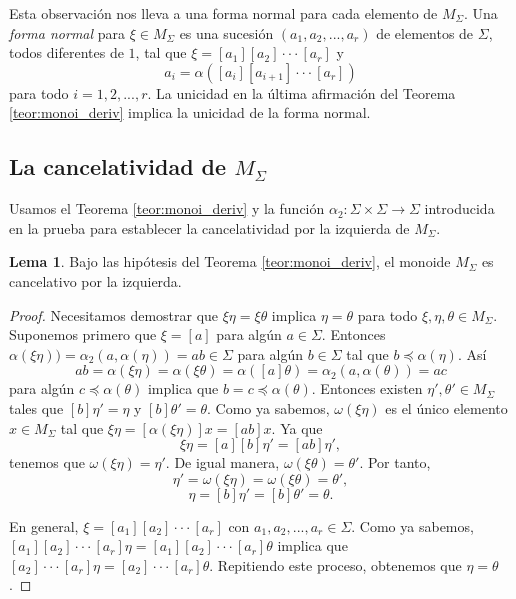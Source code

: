 \documentclass[12pt]{book}
\theoremstyle{definition}
\newtheorem{lema}{Lema}[section]
\begin{document}
Esta observación nos lleva a una forma normal para cada elemento de $M_\Sigma$. Una \textit{forma normal} para $\xi\in M_\Sigma$ es una sucesión $(a_1,a_2,...,a_r)$ de elementos de $\Sigma$, todos diferentes de $1$, tal que $\xi=[a_1][a_2]\cdot\cdot\cdot[a_r]$ y 
$$a_i=\alpha([a_i][a_{i+1}]\cdot\cdot\cdot[a_r])$$
para todo $i=1,2,...,r$. La unicidad en la última afirmación del Teorema \ref{teor:monoi_deriv} implica la unicidad de la forma normal.


\subsection{La cancelatividad de $M_\Sigma$}

Usamos el Teorema \ref{teor:monoi_deriv} y la función $\alpha_2:\Sigma\times\Sigma\rightarrow\Sigma$ introducida en la prueba para establecer la cancelatividad por la izquierda de $M_\Sigma$.

\begin{lema}
Bajo las hipótesis del Teorema \ref{teor:monoi_deriv}, el monoide $M_\Sigma$ es cancelativo por la izquierda.
\label{lema:cancel}
\end{lema}

\begin{proof} Necesitamos demostrar que $\xi\eta=\xi\theta$ implica $\eta=\theta$ para todo $\xi,\eta,\theta\in M_\Sigma$. Suponemos primero que $\xi=[a]$ para algún $a\in\Sigma$. Entonces $\alpha(\xi\eta))=\alpha_2(a,\alpha(\eta))=ab\in\Sigma$ para algún $b\in\Sigma$ tal que $b\preceq \alpha(\eta)$. Así
$$ab=\alpha(\xi\eta)=\alpha(\xi\theta)=\alpha([a]\theta)=\alpha_2(a,\alpha(\theta))=ac$$
para algún $c\preceq\alpha(\theta)$ implica que $b=c\preceq\alpha(\theta)$. Entonces existen $\eta',\theta'\in M_\Sigma$ tales que $[b]\eta'=\eta$ y $[b]\theta'=\theta$. Como ya sabemos, $\omega(\xi\eta)$ es el único elemento $x\in M_\Sigma$ tal que $\xi\eta=[\alpha(\xi\eta)]x=[ab]x$. Ya que
$$\xi\eta=[a][b]\eta'=[ab]\eta',$$
tenemos que $\omega(\xi\eta) = \eta'$. De igual manera, $\omega(\xi\theta)=\theta'$. Por tanto,
$$\eta'=\omega(\xi\eta)=\omega(\xi\theta)=\theta',$$
$$\eta=[b]\eta'=[b]\theta'=\theta.$$

En general, $\xi=[a_1][a_2]\cdot\cdot\cdot[a_r]$ con $a_1,a_2,...,a_r\in\Sigma$. Como ya sabemos, $[a_1][a_2]\cdot\cdot\cdot[a_r]\eta=[a_1][a_2]\cdot\cdot\cdot[a_r]\theta$ implica que $[a_2]\cdot\cdot\cdot[a_r]\eta=[a_2]\cdot\cdot\cdot[a_r]\theta$. Repitiendo este proceso, obtenemos que $\eta=\theta$.
\end{proof}
\end{document}
